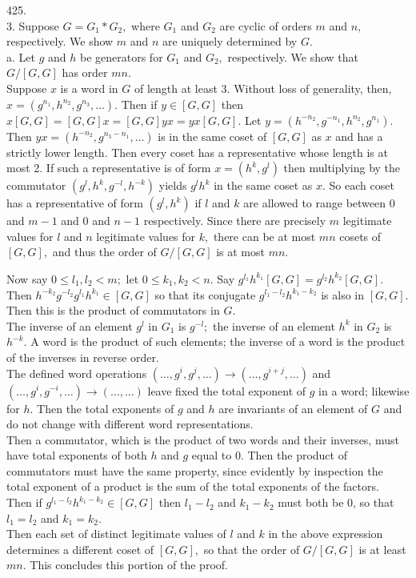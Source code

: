 \documentclass{article}
\begin{document}
425.
\\3. Suppose $G=G_1*G_2,$ where $G_1$ and $G_2$ are cyclic of orders $m$ and $n,$ respectively.  We show $m$ and $n$ are uniquely determined by $G.$
\\
a. Let $g$ and $h$ be generators for $G_1$ and $G_2,$ respectively.  We show that $G/[G,G]$ has order $mn.$
\\
Suppose $x$ is a word in $G$ of length at least 3.  Without loss of generality, then, $x=(g^{n_1},h^{n_2},g^{n_3},\ldots).$  Then if $y\in [G,G]$ then $x[G,G]=[G,G]x=[G,G]yx=yx[G,G].$  Let $y=(h^{-n_2},g^{-n_1},h^{n_2},g^{n_1}).$  Then $yx=(h^{-n_2},g^{n_3-n_1},\ldots)$ is in the same coset of $[G,G]$ as $x$ and has a strictly lower length.  Then every coset has a representative whose length is at most 2.  If such a representative is of form $x=(h^k,g^l)$ then multiplying by the commutator $(g^l,h^k,g^{-l},h^{-k})$ yields $g^lh^k$ in the same coset as $x.$  So each coset has a representative of form $(g^l,h^k)$ if $l$ and $k$ are allowed to range between $0$ and $m-1$ and $0$ and $n-1$ respectively.  Since there are precisely $m$ legitimate values for $l$ and $n$ legitimate values for $k,$ there can be at most $mn$ cosets of $[G,G],$ and thus the order of $G/[G,G]$ is at most $mn.$

Now say $0\le l_1,l_2<m;$ let $0\le k_1,k_2<n.$  Say $g^{l_1}h^{k_1}[G,G]=g^{l_2}h^{k_2}[G,G].$  Then $h^{-k_2}g^{-l_2}g^{l_1}h^{k_1}\in [G,G]$ so that its conjugate $g^{l_1-l_2}h^{k_1-k_2}$ is also in $[G,G].$  Then this is the product of commutators in $G.$
\\
The inverse of an element $g^l$ in $G_1$ is $g^{-l};$ the inverse of an element $h^k$ in $G_2$ is $h^{-k}.$  A word is the product of such elements; the inverse of a word is the product of the inverses in reverse order.
\\
The defined word operations $(\ldots,g^i,g^j,\ldots)\to (\ldots,g^{i+j},\ldots)$ and $(\ldots,g^i,g^{-i},\ldots)\to (\ldots,\ldots)$ leave fixed the total exponent of $g$ in a word; likewise for $h.$  Then the total exponents of $g$ and $h$ are invariants of an element of $G$ and do not change with different word representations.
\\
Then a commutator, which is the product of two words and their inverses, must have total exponents of both $h$ and $g$ equal to 0.  Then the product of commutators must have the same property, since evidently by inspection the total exponent of a product is the sum of the total exponents of the factors.
\\
Then if $g^{l_1-l_2}h^{k_1-k_2}\in[G,G]$ then $l_1-l_2$ and $k_1-k_2$ must both be 0, so that $l_1=l_2$ and $k_1=k_2.$
\\
Then each set of distinct legitimate values of $l$ and $k$ in the above expression determines a different coset of $[G,G],$ so that the order of $G/[G,G]$ is at least $mn.$  This concludes this portion of the proof.
\end{document}
